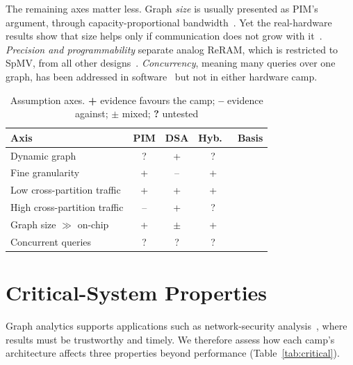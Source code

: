 \documentclass[journal,onecolumn]{IEEEtran}
\begin{document}
The remaining axes matter less. Graph \emph{size} is usually presented as PIM's argument, through capacity-proportional bandwidth~\cite{ahn2015tesseract,zhuo2019graphq}. Yet the real-hardware results show that size helps only if communication does not grow with it~\cite{gomezluna2022prim}. \emph{Precision and programmability} separate analog ReRAM, which is restricted to SpMV, from all other designs~\cite{song2018graphr}. \emph{Concurrency}, meaning many queries over one graph, has been addressed in software~\cite{yin2023glign} but not in either hardware camp.

\begin{table}[t]
\caption{Assumption axes. \textbf{+} evidence favours the camp; \textbf{--} evidence against; $\pm$ mixed; \textbf{?} untested}
\label{tab:axes}
\centering\scriptsize
\begin{tabularx}{\columnwidth}{@{}L{1.55cm}cccY@{}}
\toprule
Axis & PIM & DSA & Hyb.\ & Basis \\
\midrule
Dynamic graph & ? & + & ? & \cite{kim2020dynamic,rahman2021jetstream,gao2023mega,asquini2025tc} \\
Fine granularity & + & -- & + & \cite{shin2025piccolo,shin2025fala,yenimol2026cograf} \\
Low cross-partition traffic & + & + & + & \cite{gomezluna2022prim,cai2024pimpam} \\
High cross-partition traffic & -- & + & ? & \cite{gomezluna2022prim,barkhordar2025alphapim,zhuo2019graphq} \\
Graph size $\gg$ on-chip & + & $\pm$ & + & \cite{ahn2015tesseract,lee2022graphwave,chen2022regraph} \\
Concurrent queries & ? & ? & ? & \cite{yin2023glign} \\
\bottomrule
\end{tabularx}
\end{table}

\section{Critical-System Properties}\label{sec:critical}
Graph analytics supports applications such as network-security analysis~\cite{asquini2025tc}, where results must be trustworthy and timely. We therefore assess how each camp's architecture affects three properties beyond performance (Table~\ref{tab:critical}).
\end{document}
